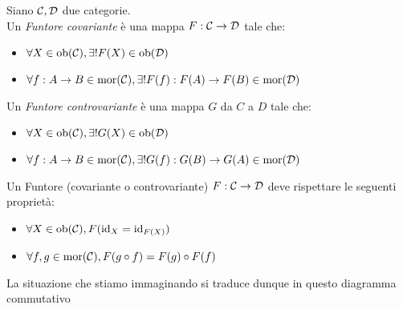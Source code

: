 \documentclass{article}
\begin{document}
\begin{definition}
    Siano $\mathcal{C}, \mathcal{D}$ due categorie.\\
    Un \emph{Funtore covariante} è una mappa $F: \mathcal{C}\to\mathcal{D}$ tale che:\begin{itemize}
        \item $\forall X \in \operatorname{ob}(\mathcal{C}), \exists! F(X)\in \operatorname{ob}(\mathcal{D})$
        \item $\forall f:A\to B \in \operatorname{mor}(\mathcal{C}), \exists! F(f):F(A)\to F(B) \in \operatorname{mor}(\mathcal{D})$
    \end{itemize}
    Un \emph{Funtore controvariante} è una mappa $G$ da $C$ a $D$ tale che:\begin{itemize}
        \item $\forall X \in \operatorname{ob}(\mathcal{C}), \exists! G(X)\in \operatorname{ob}(\mathcal{D})$
        \item $\forall f:A\to B \in \operatorname{mor}(\mathcal{C}), \exists! G(f):G(B)\to G(A) \in \operatorname{mor}(\mathcal{D})$
    \end{itemize}
    Un Funtore (covariante o controvariante) $F:\mathcal{C}\to \mathcal{D}$ deve rispettare le seguenti proprietà:\begin{itemize}
        \item $\forall X \in \operatorname{ob}(\mathcal{C}), F(\operatorname{id}_{X} = \operatorname{id}_{F(X)})$
        \item $\forall f,g \in \operatorname{mor}(\mathcal{C}),F(g\circ f) = F(g) \circ F(f)$
    \end{itemize}
\end{definition}

La situazione che stiamo immaginando si traduce dunque in questo diagramma commutativo
\end{document}
